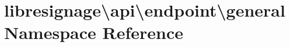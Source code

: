\hypertarget{namespacelibresignage_1_1api_1_1endpoint_1_1general}{}\section{libresignage\textbackslash{}api\textbackslash{}endpoint\textbackslash{}general Namespace Reference}
\label{namespacelibresignage_1_1api_1_1endpoint_1_1general}
